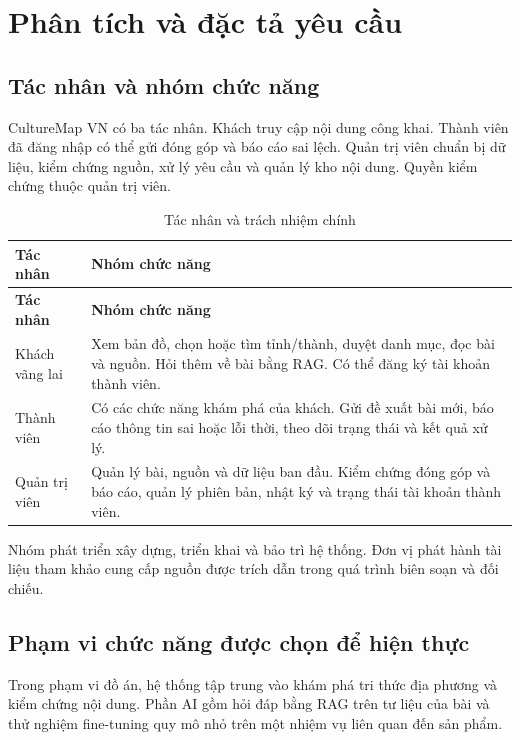 \section{Phân tích và đặc tả yêu cầu}
\label{sec:requirements}
\begingroup
{}
\setlength{\parskip}{4pt}
\renewcommand{\arraystretch}{1.22}
\setlength{\extrarowheight}{1pt}

\subsection{Tác nhân và nhóm chức năng}
CultureMap VN có ba tác nhân. Khách truy cập nội dung công khai. Thành viên đã đăng nhập
có thể gửi đóng góp và báo cáo sai lệch. Quản trị viên chuẩn bị dữ liệu, kiểm chứng nguồn,
xử lý yêu cầu và quản lý kho nội dung. Quyền kiểm chứng thuộc quản trị viên.


\begin{longtable}{|L{28mm}|L{116mm}|}
\caption{Tác nhân và trách nhiệm chính}\label{tab:actors}\\\hline
{}\textbf{Tác nhân} & \textbf{Nhóm chức năng}\\\hline
\endfirsthead
\hline
{}\textbf{Tác nhân} & \textbf{Nhóm chức năng}\\\hline
\endhead
\endfoot
Khách vãng lai & Xem bản đồ, chọn hoặc tìm tỉnh/thành, duyệt danh mục, đọc bài và nguồn. Hỏi thêm về bài bằng RAG. Có thể đăng ký tài khoản thành viên.\\\hline
Thành viên & Có các chức năng khám phá của khách. Gửi đề xuất bài mới, báo cáo thông tin sai hoặc lỗi thời, theo dõi trạng thái và kết quả xử lý.\\\hline
Quản trị viên & Quản lý bài, nguồn và dữ liệu ban đầu. Kiểm chứng đóng góp và báo cáo, quản lý phiên bản, nhật ký và trạng thái tài khoản thành viên.\\\hline
\end{longtable}

Nhóm phát triển xây dựng, triển khai và bảo trì hệ thống. Đơn vị phát hành tài liệu
tham khảo cung cấp nguồn được trích dẫn trong quá trình biên soạn và đối chiếu.

\subsection{Phạm vi chức năng được chọn để hiện thực}
Trong phạm vi đồ án, hệ thống tập trung vào khám phá tri thức địa phương và kiểm chứng
nội dung. Phần AI gồm hỏi đáp bằng RAG trên tư liệu của bài và thử nghiệm fine-tuning
quy mô nhỏ trên một nhiệm vụ liên quan đến sản phẩm.

